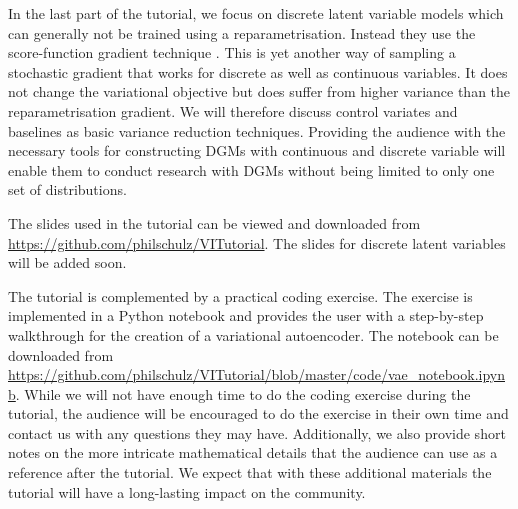 In the last part of the tutorial, we focus on discrete latent variable models which can generally
not be trained using a reparametrisation. Instead they use the score-function gradient technique
\citep{Williams:1992, PaisleyEtAl:2012}.
This is yet another way of sampling a stochastic gradient that works for discrete as well as continuous variables. It does not change the variational objective but does suffer from higher variance than
the reparametrisation gradient. We will therefore discuss control variates and baselines as basic
variance reduction techniques. Providing the audience with the necessary tools for constructing DGMs with continuous
and discrete variable will enable them to conduct research with DGMs without being limited
to only one set of distributions.

The slides used in the tutorial can be viewed and downloaded from \url{https://github.com/philschulz/VITutorial}. The slides for discrete latent variables will be added soon.

The tutorial is complemented by a practical coding exercise. 
The exercise is implemented
in a Python notebook and provides the user with a step-by-step walkthrough for the 
creation of a variational autoencoder. The notebook can be downloaded
from \url{https://github.com/philschulz/VITutorial/blob/master/code/vae_notebook.ipynb}.
While we will not have enough
time to do the coding exercise during the tutorial, the audience will be encouraged to do the
exercise in their own time and contact us with any questions they may have. Additionally, we also
provide short notes on the more intricate mathematical details that the audience can use as 
a reference after the tutorial. We expect that with these additional materials the tutorial will
have a long-lasting impact on the community.